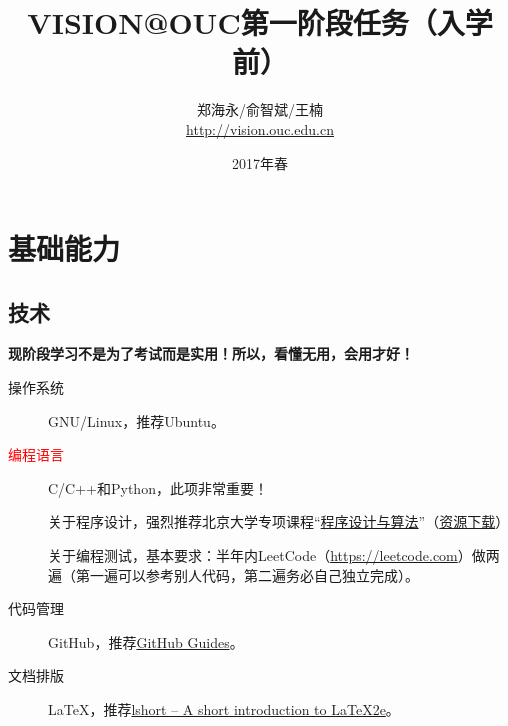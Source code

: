 \documentclass[14pt,a4paper]{extarticle}
\begin{document}
\title{\vspace{-2em}VISION@OUC第一阶段任务（入学前）\vspace{-0.7em}}
\author{郑海永/俞智斌/王楠\\\url{http://vision.ouc.edu.cn}}
\date{\vspace{-0.7em}2017年春\vspace{-0.7em}}
\maketitle\thispagestyle{fancy}
\maketitle
\tableofcontents

\section{基础能力}

\subsection{技术}

\textbf{现阶段学习不是为了考试而是实用！所以，看懂无用，会用才好！}

\begin{description}
\item[操作系统] GNU/Linux，推荐Ubuntu。
\item[\textcolor{red}{编程语言}] C/C++和Python，此项非常重要！

关于程序设计，强烈推荐北京大学专项课程“\href{https://www.coursera.org/specializations/biancheng-suanfa}{程序设计与算法}”（\href{http://vision.ouc.edu.cn/~zhenghaiyong/courses/oop/2017spring/mooc/}{资源下载}）

关于编程测试，基本要求：半年内LeetCode（\url{https://leetcode.com}）做两遍（第一遍可以参考别人代码，第二遍务必自己独立完成）。
\item[代码管理] GitHub，推荐\href{https://guides.github.com/}{GitHub Guides}。
\item[文档排版] \LaTeX{}，推荐\href{https://www.ctan.org/tex-archive/info/lshort/}{lshort – A short in­tro­duc­tion to \LaTeX2e{}}。
\end{description}
\end{document}
